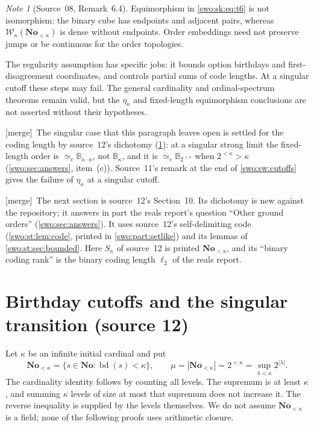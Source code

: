 \documentclass[11pt]{article}
\theoremstyle{definition}
\theoremstyle{remark}
\newtheorem{note}[note]{Note}
\newcommand{\No}{\mathbf{No}}
\newcommand{\W}{\mathcal W}
\newcommand{\B}{\mathbb B}
\newcommand{\bl}{\ell_2}
\newcommand{\bd}{\operatorname{bd}}
\newcommand{\equi}{\mathrel{\simeq_{\!e}}}
\newcommand{\merge}{\textsf{[merge]}}
\begin{document}
\begin{note}[Source~08, Remark~6.4]\label{swo:sk:n6.4}
Equimorphism in \eqref{swo:sk:eq:t6} is not isomorphism: the binary cube has
endpoints and adjacent pairs, whereas $\W_\kappa(\No_{<\kappa})$ is dense
without endpoints. Order embeddings need not preserve jumps or be continuous
for the order topologies.
\end{note}

The regularity assumption has specific jobs: it bounds option birthdays
and first-disagreement coordinates, and controls partial sums of code
lengths. At a singular cutoff these steps may fail. The general
cardinality and ordinal-spectrum theorems remain valid, but the
$\eta_\kappa$ and fixed-length equimorphism conclusions are not asserted
without their hypotheses.


\merge\ The singular case that this paragraph leaves open is settled for the
coding length by source~12's dichotomy (\cref{swo:st:sec:transition}): at a
singular strong limit the fixed-length order is $\equi\B_{\kappa\cdot\kappa}$,
not $\B_\kappa$, and it is $\equi\B_{2^{<\kappa}}$ when $2^{<\kappa}>\kappa$
(\cref{swo:sec:answers}, item~(c)). Source~11's remark at the end of
\cref{swo:sw:cutoffs} gives the failure of $\eta_\kappa$ at a singular cutoff.


\merge\ The next section is source~12's Section~10. Its dichotomy is new
against the repository; it answers in part the reals report's question
``Other ground orders'' (\cref{swo:sec:answers}). It uses source~12's
self-delimiting code (\cref{swo:st:lem:code}, printed in
\cref{swo:part:setlike}) and its lemmas of
\cref{swo:st:sec:bounded}. Here $S_\kappa$ of source~12 is printed
$\No_{<\kappa}$, and its ``binary coding rank'' is the binary coding length
$\bl$ of the reals report.

\section{Birthday cutoffs and the singular transition (source 12)}
\label{swo:st:sec:transition}

Let $\kappa$ be an infinite initial cardinal and put
\[
 \No_{<\kappa}=\{s\in\No:\bd(s)<\kappa\},\qquad
 \mu=|\No_{<\kappa}|=2^{<\kappa}
       =\sup_{\lambda<\kappa}2^{|\lambda|}.
\]
The cardinality identity follows by counting all levels. The supremum is
at least $\kappa$, and summing $\kappa$ levels of size at most that
supremum does not increase it. The reverse inequality is supplied by the
levels themselves. We do not assume $\No_{<\kappa}$ is a field; none of the
following proofs uses arithmetic closure.
\end{document}
